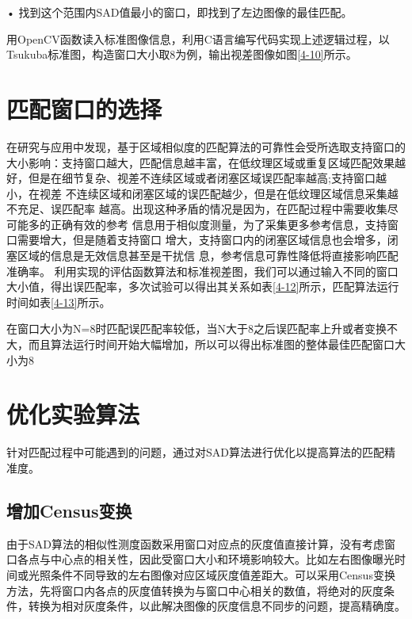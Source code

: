 •  找到这个范围内SAD值最小的窗口，即找到了左边图像的最佳匹配。

用OpenCV函数读入标准图像信息，利用C语言编写代码实现上述逻辑过程，以Tsukuba标准图，构造窗口大小取8为例，输出视差图像如图\ref{4-10}所示。


\section{匹配窗口的选择}

在研究与应用中发现，基于区域相似度的匹配算法的可靠性会受所选取支持窗口的大小影响：支持窗口越大，匹配信息越丰富，在低纹理区域或重复区域匹配效果越好，但是在细节复杂、视差不连续区域或者闭塞区域误匹配率越高;支持窗口越小，在视差
不连续区域和闭塞区域的误匹配越少，但是在低纹理区域信息采集越不充足、误匹配率
越高。出现这种矛盾的情况是因为，在匹配过程中需要收集尽可能多的正确有效的参考
信息用于相似度测量，为了采集更多参考信息，支持窗口需要增大，但是随着支持窗口
增大，支持窗口内的闭塞区域信息也会增多，闭塞区域的信息是无效信息甚至是干扰信
息，参考信息可靠性降低将直接影响匹配准确率。
利用实现的评估函数算法和标准视差图，我们可以通过输入不同的窗口大小值，得出误匹配率，多次试验可以得出其关系如表\ref{4-12}所示，匹配算法运行时间如表\ref{4-13}所示。


在窗口大小为N=8时匹配误匹配率较低，当N大于8之后误匹配率上升或者变换不大，而且算法运行时间开始大幅增加，所以可以得出标准图的整体最佳匹配窗口大小为8

\section{优化实验算法}

针对匹配过程中可能遇到的问题，通过对SAD算法进行优化以提高算法的匹配精准度。

\subsection{增加Census变换}


由于SAD算法的相似性测度函数采用窗口对应点的灰度值直接计算，没有考虑窗口各点与中心点的相关性，因此受窗口大小和环境影响较大。比如左右图像曝光时间或光照条件不同导致的左右图像对应区域灰度值差距大。可以采用Census变换方法，先将窗口内各点的灰度值转换为与窗口中心相关的数值，将绝对的灰度条件，转换为相对灰度条件，以此解决图像的灰度信息不同步的问题，提高精确度。

